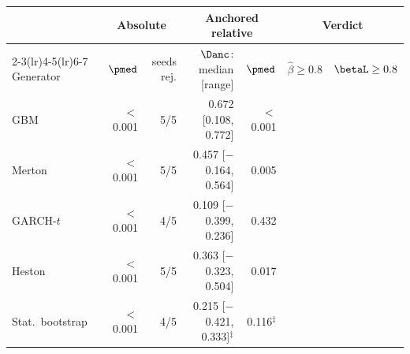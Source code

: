 \begin{tabular}{lrrrrll}
\toprule
 & \multicolumn{2}{c}{Absolute \WC{}} & \multicolumn{2}{c}{Anchored relative} & \multicolumn{2}{c}{Verdict} \\
\cmidrule(lr){2-3}\cmidrule(lr){4-5}\cmidrule(lr){6-7}
Generator & $\pmed$ & seeds rej. & $\Danc$: median [range] & $\pmed$ & $\hat\beta\ge0.8$ & $\betaL\ge0.8$ \\
\midrule
GBM & $<$0.001 & 5/5 & 0.672 [0.108, 0.772] & $<$0.001 & \BAD{} & \BAD{} \\
Merton & $<$0.001 & 5/5 & 0.457 [$-$0.164, 0.564] & 0.005 & \BAD{} & \BAD{} \\
GARCH-$t$ & $<$0.001 & 4/5 & 0.109 [$-$0.399, 0.236] & 0.432 & \INCONCL{} & \INCONCL{} \\
Heston & $<$0.001 & 5/5 & 0.363 [$-$0.323, 0.504] & 0.017 & \BAD{} & \BAD{} \\
Stat.\ bootstrap & $<$0.001 & 4/5 & 0.215 [$-$0.421, 0.333]$^{\ddagger}$ & 0.116$^{\ddagger}$ & \INVALID{} & \INVALID{} \\
\bottomrule
\end{tabular}
